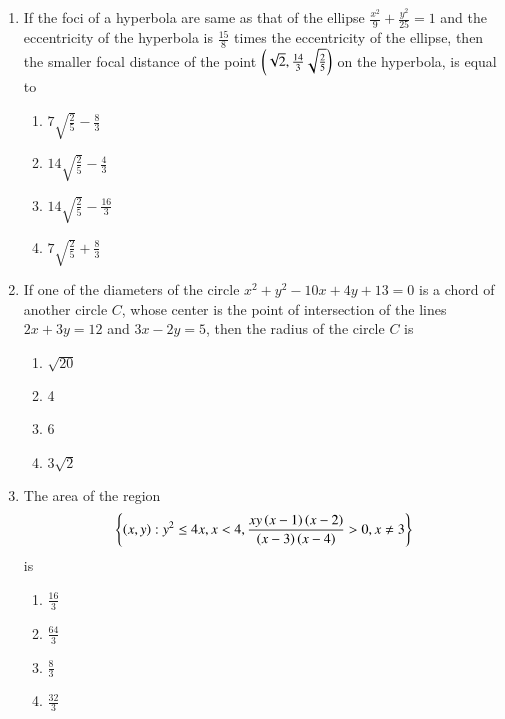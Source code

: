 \documentclass[journal]{IEEEtran}
\begin{document}
\begin{enumerate}
    \item If the foci of a hyperbola are same as that of the ellipse
    $\frac{x^2}{9} + \frac{y^2}{25} = 1$ and the eccentricity of the
    hyperbola is $\frac{15}{8}$ times the eccentricity of the
    ellipse, then the smaller focal distance of the point
    $\left(\sqrt{2}, \frac{14}{3} \sqrt{\frac{2}{5}}\right)$ on the hyperbola,
    is equal to

    \begin{multicols}{4}
\begin{enumerate}

        \item $7\sqrt{\frac{2}{5}} - \frac{8}{3}$
        \item $14\sqrt{\frac{2}{5}} - \frac{4}{3}$
        \item $14\sqrt{\frac{2}{5}} - \frac{16}{3}$
        \item $7\sqrt{\frac{2}{5}} + \frac{8}{3}$
    \end{enumerate}
\end{multicols}

    \item If one of the diameters of the circle $x^2 + y^2 - 10x +
    4y + 13 = 0$ is a chord of another circle $C$, whose
    center is the point of intersection of the lines $2x +
    3y = 12$ and $3x - 2y = 5$, then the radius of the
    circle $C$ is
    
    \begin{multicols}{4}
\begin{enumerate}

        \item $\sqrt{20}$
        \item 4
        \item 6
        \item $3\sqrt{2}$
    \end{enumerate}
\end{multicols}

    \item The area of the region
        \begin{align*}
            \left\{\left(x,y\right): y^2\le 4x,x<4,\frac{xy\left(x-1\right)\left(x-2\right)}{\left(x-3\right)\left(x-4\right)}>0,x\ne3\right\}
        \end{align*}
    is

    \begin{multicols}{4}
\begin{enumerate}

        \item $\frac{16}{3}$
        \item $\frac{64}{3}$
        \item $\frac{8}{3}$
        \item $\frac{32}{3}$
    \end{enumerate}
\end{multicols}


\end{enumerate}
\end{document}
